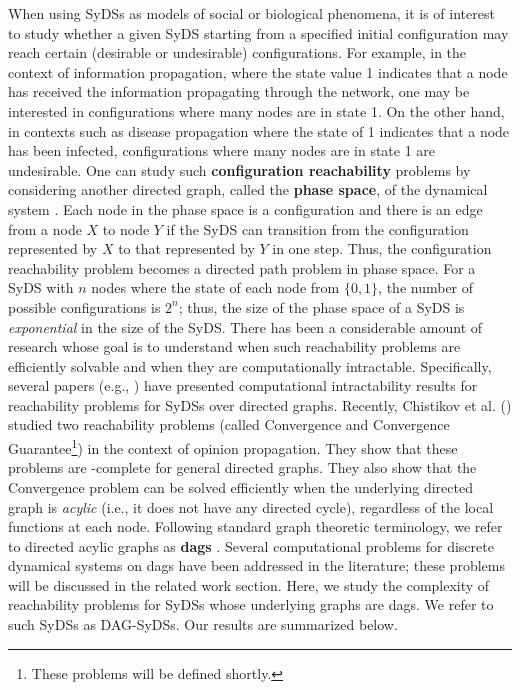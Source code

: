 When using SyDSs as models of social or biological phenomena, it is of interest 
to study whether a given SyDS starting from a specified
initial configuration  may reach certain
(desirable or undesirable) configurations.
For example, in the context of information propagation, where the
state value 1 indicates that a node has received the information
propagating through the network,
one may be interested in configurations where many nodes are in state 1.
On the other hand, in contexts such as disease propagation where
the state of 1 indicates that a node has been infected,
configurations where many nodes are in state 1 are undesirable.
One can study such \textbf{configuration reachability} problems
by considering another directed graph,
called the \textbf{phase space}, of the dynamical system \cite{MR-2007}.
Each node in the phase space is a configuration and there is an
edge from a node $X$ to node $Y$ if the SyDS can transition from
the configuration represented by $X$ to that represented by
$Y$ in one step.
Thus, the configuration reachability problem becomes a directed
path problem in phase space.
For a SyDS with $n$ nodes where the state of each node from $\{0,1\}$,
the number of possible configurations is $2^n$; thus, the size of
the phase space of a SyDS is \emph{exponential} in the size of
the SyDS.
There has been a considerable amount of research whose goal is
to understand when such reachability problems are efficiently solvable
and when they are computationally intractable.
Specifically, several papers (e.g., \cite{OU-2017,Akutsu-etal-2007}) have
presented computational intractability results for reachability 
problems for SyDSs over directed graphs.
Recently, Chistikov et al. (\citeyear{Chistikov-etal-2020})
studied two reachability problems (called Convergence and Convergence
Guarantee\footnote{These problems will be defined shortly.}) 
in the context of opinion propagation.
They show that these problems are \cpsp-complete for general
directed graphs. They also show
that the Convergence problem can be solved
efficiently when the underlying directed graph is \emph{acylic} (i.e.,
it does not have any directed cycle), regardless of the local functions
at each node.
Following standard graph theoretic terminology, we refer to directed
acylic graphs as \textbf{dags} \cite{CLRS-2009}.
Several computational problems for discrete dynamical systems
on dags have been addressed in the literature; these problems
will be discussed in the related work section.
Here, we study the complexity of reachability problems for
SyDSs whose underlying graphs are dags.
We refer to such SyDSs as DAG-SyDSs.
Our results are summarized below.

